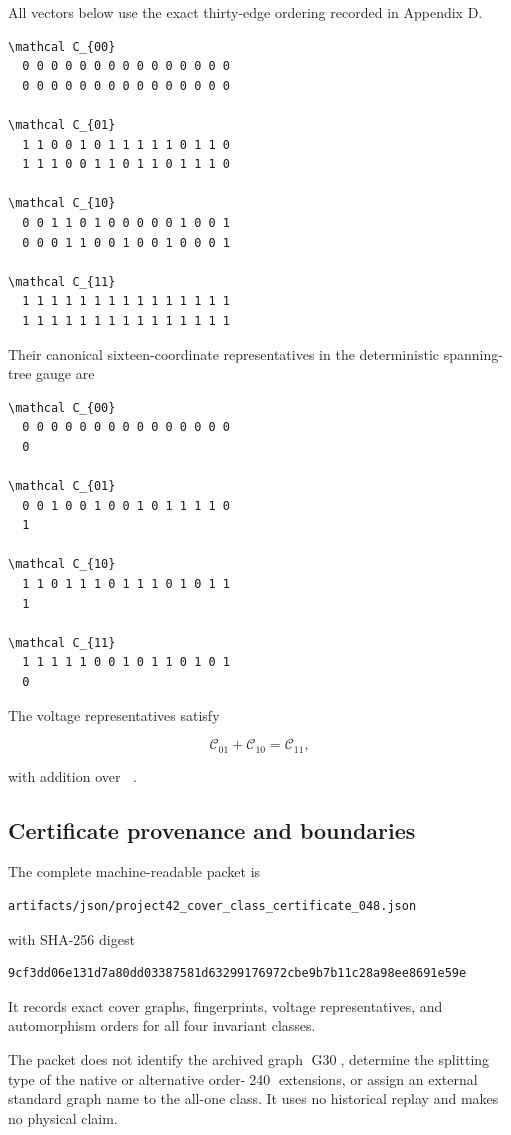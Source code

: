 All vectors below use the exact thirty-edge ordering recorded in
Appendix D.

\begin{verbatim}
\mathcal C_{00}
  0 0 0 0 0 0 0 0 0 0 0 0 0 0 0
  0 0 0 0 0 0 0 0 0 0 0 0 0 0 0

\mathcal C_{01}
  1 1 0 0 1 0 1 1 1 1 1 0 1 1 0
  1 1 1 0 0 1 1 0 1 1 0 1 1 1 0

\mathcal C_{10}
  0 0 1 1 0 1 0 0 0 0 0 1 0 0 1
  0 0 0 1 1 0 0 1 0 0 1 0 0 0 1

\mathcal C_{11}
  1 1 1 1 1 1 1 1 1 1 1 1 1 1 1
  1 1 1 1 1 1 1 1 1 1 1 1 1 1 1
\end{verbatim}

Their canonical sixteen-coordinate representatives in the deterministic
spanning-tree gauge are

\begin{verbatim}
\mathcal C_{00}
  0 0 0 0 0 0 0 0 0 0 0 0 0 0 0
  0

\mathcal C_{01}
  0 0 1 0 0 1 0 0 1 0 1 1 1 1 0
  1

\mathcal C_{10}
  1 1 0 1 1 1 0 1 1 1 0 1 0 1 1
  1

\mathcal C_{11}
  1 1 1 1 1 0 0 1 0 1 1 0 1 0 1
  0
\end{verbatim}

The voltage representatives satisfy

\[
\mathcal C_{01}+\mathcal C_{10}
=
\mathcal C_{11},
\]

with addition over \Ftwo.

\subsection{Certificate provenance and boundaries}

The complete machine-readable packet is

\begin{verbatim}
artifacts/json/project42_cover_class_certificate_048.json
\end{verbatim}

with SHA-256 digest

\begin{verbatim}
9cf3dd06e131d7a80dd03387581d63299176972cbe9b7b11c28a98ee8691e59e
\end{verbatim}

It records exact cover graphs, fingerprints, voltage representatives, and
automorphism orders for all four invariant classes.

The packet does not identify the archived graph G30, determine the
splitting type of the native or alternative order-240 extensions, or
assign an external standard graph name to the all-one class. It uses no
historical replay and makes no physical claim.

